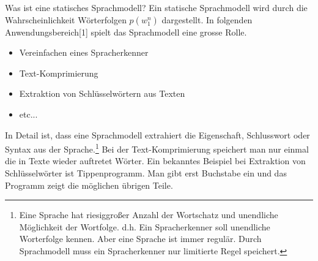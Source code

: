 
Was ist eine statisches Sprachmodell? Ein statische Sprachmodell wird durch die Wahrscheinlichkeit W\"orterfolgen $p(w_{1}^n)$ dargestellt.
In folgenden Anwendungsbereich[1] spielt das Sprachmodell eine grosse Rolle.
\begin{itemize}
	\item Vereinfachen eines Spracherkenner
	\item Text-Komprimierung
	\item Extraktion von Schl\"usselw\"ortern aus Texten
	\item etc...
\end{itemize}
In Detail ist, dass eine Sprachmodell extrahiert die Eigenschaft, Schlusswort oder Syntax aus der Sprache.\footnote{Eine Sprache hat riesiggro\ss er Anzahl der Wortschatz und unendliche M\"oglichkeit der Wortfolge. d.h. Ein Spracherkenner soll unendliche Worterfolge kennen. Aber eine Sprache ist immer regul\"ar. Durch Sprachmodell muss ein Spracherkenner  nur  limitierte Regel speichert.}
Bei der Text-Komprimierung speichert man nur einmal die in Texte wieder auftretet W\"orter. Ein bekanntes Beispiel bei Extraktion von Schl\"usselw\"orter ist Tippenprogramm. Man gibt erst Buchstabe ein und das Programm zeigt die m\"oglichen \"ubrigen Teile.